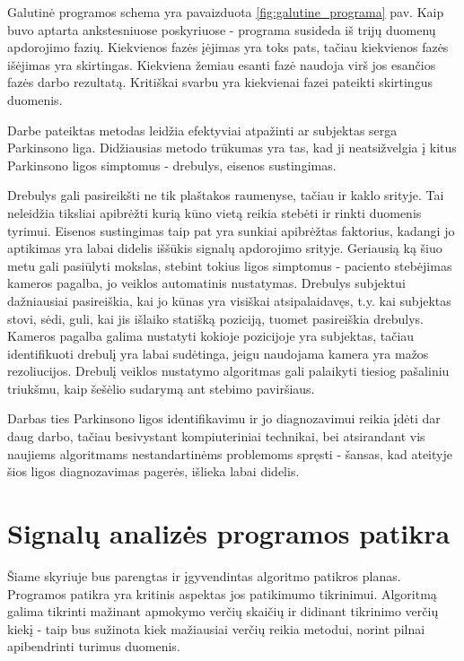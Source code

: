 \documentclass[]{vgtuef}
\begin{document}
Galutinė programos schema yra pavaizduota \ref{fig:galutine_programa} pav. Kaip buvo aptarta ankstesniuose poskyriuose - programa susideda iš trijų duomenų apdorojimo fazių. Kiekvienos fazės įėjimas yra toks pats, tačiau kiekvienos fazės išėjimas yra skirtingas. Kiekviena žemiau esanti fazė naudoja virš jos esančios fazės darbo rezultatą. Kritiškai svarbu yra kiekvienai fazei pateikti skirtingus duomenis.

Darbe pateiktas metodas leidžia efektyviai atpažinti ar subjektas serga Parkinsono liga. Didžiausias metodo trūkumas yra tas, kad ji neatsižvelgia į kitus Parkinsono ligos simptomus - drebulys, eisenos sustingimas.

Drebulys gali pasireikšti ne tik plaštakos raumenyse, tačiau ir kaklo srityje. Tai neleidžia tiksliai apibrėžti kurią kūno vietą reikia stebėti ir rinkti duomenis tyrimui. Eisenos sustingimas taip pat yra sunkiai apibrėžtas faktorius, kadangi jo aptikimas yra labai didelis iššūkis signalų apdorojimo srityje. Geriausią ką šiuo metu gali pasiūlyti mokslas, stebint tokius ligos simptomus - paciento stebėjimas kameros pagalba, jo veiklos automatinis nustatymas. Drebulys subjektui dažniausiai pasireiškia, kai jo kūnas yra visiškai atsipalaidavęs, t.y. kai subjektas stovi, sėdi, guli, kai jis išlaiko statišką poziciją, tuomet pasireiškia drebulys. Kameros pagalba galima nustatyti kokioje pozicijoje yra subjektas, tačiau identifikuoti drebulį yra labai sudėtinga, jeigu naudojama kamera yra mažos rezoliucijos. Drebulį veiklos nustatymo algoritmas gali palaikyti tiesiog pašaliniu triukšmu, kaip šešėlio sudarymą ant stebimo paviršiaus. 

Darbas ties Parkinsono ligos identifikavimu ir jo diagnozavimui reikia įdėti dar daug darbo, tačiau besivystant kompiuteriniai technikai, bei atsirandant vis naujiems algoritmams nestandartinėms problemoms spręsti - šansas, kad ateityje šios ligos diagnozavimas pagerės, išlieka labai didelis.

\section{Signalų analizės programos patikra}

Šiame skyriuje bus parengtas ir įgyvendintas algoritmo patikros planas. Programos patikra yra kritinis aspektas jos patikimumo tikrinimui. Algoritmą galima tikrinti mažinant apmokymo verčių skaičių ir didinant tikrinimo verčių kiekį - taip bus sužinota kiek mažiausiai verčių reikia metodui, norint pilnai apibendrinti turimus duomenis.
\end{document}
